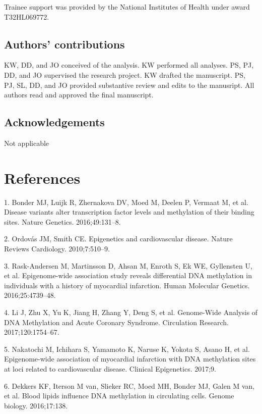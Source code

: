 \documentclass[]{bmcart}
\theoremstyle{definition}
\theoremstyle{definition}
\theoremstyle{definition}
\theoremstyle{remark}
\begin{document}
Trainee support was provided by the National Institutes of Health under
award T32HL069772.

\subsection{Authors' contributions}\label{authors-contributions}

KW, DD, and JO conceived of the analysis. KW performed all analyses. PS,
PJ, DD, and JO supervised the research project. KW drafted the
manuscript. PS, PJ, SL, DD, and JO provided substantive review and edits
to the manusript. All authors read and approved the final manuscript.

\subsection{Acknowledgements}\label{acknowledgements}

Not applicable

\section{References}\label{references}


1. Bonder MJ, Luijk R, Zhernakova DV, Moed M, Deelen P, Vermaat M, et
al. Disease variants alter transcription factor levels and methylation
of their binding sites. Nature Genetics. 2016;49:131--8.

2. Ordov{á}s JM, Smith CE. Epigenetics and cardiovascular disease.
Nature Reviews Cardiology. 2010;7:510--9.

3. Rask-Andersen M, Martinsson D, Ahsan M, Enroth S, Ek WE, Gyllensten
U, et al. Epigenome-wide association study reveals differential DNA
methylation in individuals with a history of myocardial infarction.
Human Molecular Genetics. 2016;25:4739--48.

4. Li J, Zhu X, Yu K, Jiang H, Zhang Y, Deng S, et al. Genome-Wide
Analysis of DNA Methylation and Acute Coronary Syndrome. Circulation
Research. 2017;120:1754--67.

5. Nakatochi M, Ichihara S, Yamamoto K, Naruse K, Yokota S, Asano H, et
al. Epigenome-wide association of myocardial infarction with DNA
methylation sites at loci related to cardiovascular disease. Clinical
Epigenetics. 2017;9.

6. Dekkers KF, Iterson M van, Slieker RC, Moed MH, Bonder MJ, Galen M
van, et al. Blood lipids influence DNA methylation in circulating cells.
Genome biology. 2016;17:138.
\end{document}
